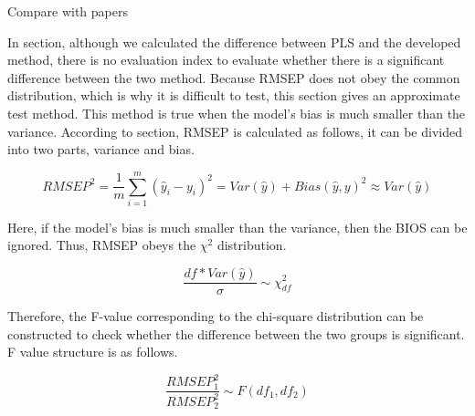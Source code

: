 \documentclass{beamer}             %
\begin{document}
	\begin{frame}[containsverbatim]{Compare with papers}
	
		
	In section, although we calculated the difference between PLS and the developed method, there is no evaluation index to evaluate whether there is a significant difference between the two method. Because RMSEP does not obey the common distribution, which is why it is difficult to test, this section gives an approximate test method. This method is true when the model's bias is much smaller than the variance. According to section, RMSEP is calculated as follows, it can be divided into two parts, variance and bias.
	
	
	\begin{equation}
	RMSEP^2={\frac{1}{m}\sum_{i=1}^{m} (\hat y_i-y_i)^2}=Var(\hat{y})+Bias(\hat{y},y)^2 \approx Var(\hat{y})
	\end{equation}
	
	Here, if the model's bias is much smaller than the variance, then the BIOS can be ignored. Thus, RMSEP obeys the $\chi^2$ distribution. 
	
	\begin{equation}
	\dfrac{df*Var(\hat{y})}{\sigma} \sim \chi_{df}^2
	\end{equation}

	
	
	Therefore, the F-value corresponding to the chi-square distribution can be constructed to check whether the difference between the two groups is significant. F value structure is as follows.
	
	\begin{equation}
	\frac{RMSEP_{1}^{2}}{RMSEP_{2}^{2}} \sim F(df_1,df_2)
	\end{equation}

	
		\end{frame}
\end{document}
